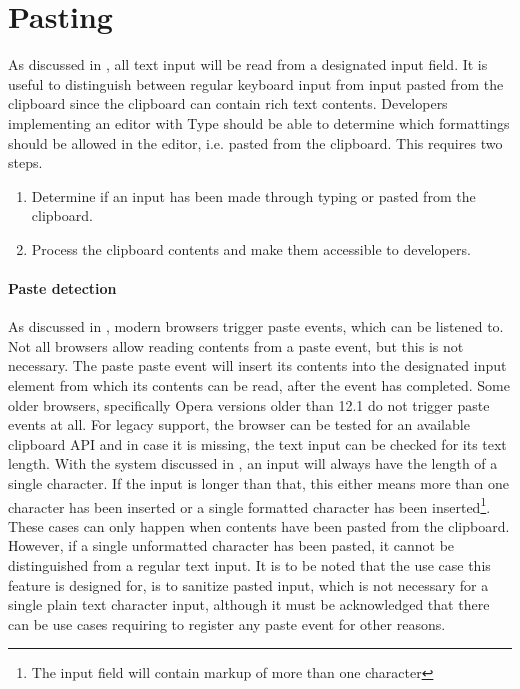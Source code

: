 \section{Pasting}
\label{sec:impl_pasting}

As discussed in , all text input will be read from a designated input field. It is useful to distinguish between regular keyboard input from input pasted from the clipboard since the clipboard can contain rich text contents. Developers implementing an editor with Type should be able to determine which formattings should be allowed in the editor, i.e. pasted from the clipboard. This requires two steps.

\begin{enumerate}
\item Determine if an input has been made through typing or pasted from the clipboard.
\item Process the clipboard contents and make them accessible to developers.
\end{enumerate}

\paragraph{Paste detection} As discussed in , modern browsers trigger paste events, which can be listened to. Not all browsers allow reading contents from a paste event, but this is not necessary. The paste paste event will insert its contents into the designated input element from which its contents can be read, after the event has completed. Some older browsers, specifically Opera versions older than 12.1 do not trigger paste events at all. For legacy support, the browser can be tested for an available clipboard API and in case it is missing, the text input can be checked for its text length. With the system discussed in , an input will always have the length of a single character. If the input is longer than that, this either means more than one character has been inserted or a single formatted character has been inserted\footnote{The input field will contain markup of more than one character}. These cases can only happen when contents have been pasted from the clipboard. However, if a single unformatted character has been pasted, it cannot be distinguished from a regular text input. It is to be noted that the use case this feature is designed for, is to sanitize pasted input, which is not necessary for a single plain text character input, although it must be acknowledged that there can be use cases requiring to register any paste event for other reasons.

